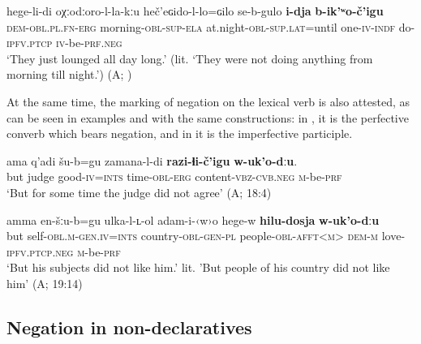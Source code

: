 \documentclass[output=paper,colorlinks=true, citecolor=brown]{langscibook}
\begin{document}
\ea\label{ex:and:9} 
    \gll  hege{}-li{}-di oχːodːoro{}-l{}-la{}-kːu heč’eɢido{}-l{}-lo=ɢilo se{}-b{}-gulo \textbf{i{}-dja} \textbf{b{}-ik’ʷo{}-č’igu}\\ 
          \textsc{dem-obl.pl.fn{}-erg} morning-\textsc{obl}{}-\textsc{sup{}-ela} at.night{}-\textsc{obl}{}-\textsc{sup.lat}=until  one-\textsc{iv-indf} do-\textsc{ipfv.ptcp} \textsc{iv}{}-be-\textsc{prf.neg}\\
    \glt ‘They just lounged all day long.’ (lit. ‘They were not doing anything from morning till night.’) (A; )
\z 

At the same time, the marking of negation on the lexical verb is also attested, as can be seen in examples  and  with the same constructions: in , it is the perfective converb which bears negation, and in  it is the imperfective participle.

\ea
    \label{ex:and:10} 
        \gll ama q’adi šu{}-b=gu zamana{}-l{}-di \textbf{razi{}-ɬi{}-č’igu} \textbf{w{}-uk’o{}-dːu}.\\
          but judge good-\textsc{iv=ints} time{}-\textsc{obl}{}-\textsc{erg} content-\textsc{vbz-cvb.neg} \textsc{m}{}-be-\textsc{prf}\\
         \glt ‘But for some time the judge did not agree’ (A;  18:4)
\z

\ea\label{ex:and:11} 
    \gll  amma en{}-šːu{}-b=gu ulka{}-l{}-ʟ{}-ol adam{}-i{}-‹w›o  hege{}-w \textbf{hilu{}-dosja} \textbf{w{}-uk’o{}-dːu}\\ 
           but self-\textsc{obl.m-gen.iv=ints} country{}-\textsc{obl}{}-\textsc{gen-pl} people{}-\textsc{obl}{}-\textsc{afft<m>}  \textsc{dem-m} love-\textsc{ipfv.ptcp.neg} \textsc{m}{}-be-\textsc{prf}\\
    \glt ‘But his subjects did not like him.’ lit. 'But people of his country did not like him' (A;  19:14)
\z 

\subsection{Negation in non-declaratives} \label{sec:and:2.2}
\end{document}
